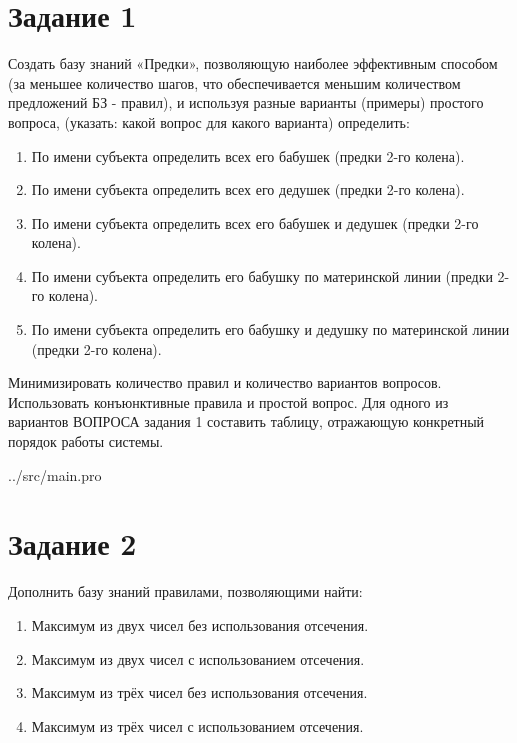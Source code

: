 \section*{Задание 1}
Создать базу знаний  «Предки», позволяющую наиболее эффективным способом (за   меньшее   количество   шагов,   что   обеспечивается   меньшим   количеством предложений БЗ - правил), и используя разные варианты (примеры) простого вопроса, (указать: какой вопрос для какого варианта) определить:
\begin{enumerate}
	\item По имени субъекта определить всех его бабушек (предки 2-го колена).
	\item По имени субъекта определить всех его дедушек (предки 2-го колена).
	\item По имени субъекта определить всех его бабушек и дедушек (предки 2-го
колена).
	\item По имени субъекта определить его бабушку по материнской линии (предки 2-го
колена).
	\item По имени субъекта определить его бабушку и дедушку по материнской линии
(предки 2-го колена).
\end{enumerate}

Минимизировать количество правил и количество вариантов вопросов. Использовать
конъюнктивные правила и простой вопрос. Для одного из вариантов ВОПРОСА задания 1
составить таблицу, отражающую конкретный порядок работы системы.

\begin{lstinputlisting}[
	label={lst:t1},
	]{../src/main.pro}
\end{lstinputlisting}

\clearpage

\section*{Задание 2}

Дополнить базу знаний правилами, позволяющими найти:
\begin{enumerate}
	\item Максимум из двух чисел без использования отсечения.
	\item Максимум из двух чисел с использованием отсечения.
	\item Максимум из трёх чисел без использования отсечения.
	\item Максимум из трёх чисел с использованием отсечения.
\end{enumerate}

